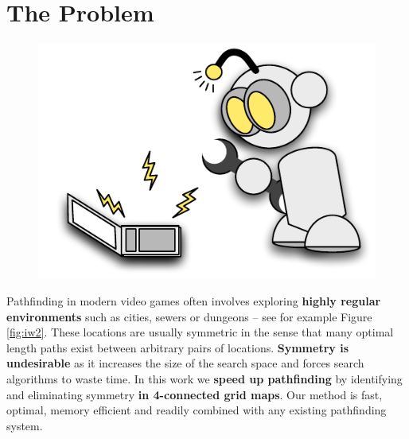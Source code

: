 \section{The Problem}
 \begin{figure}
\vspace{-3em}
		\includegraphics[width=0.30\columnwidth]{diagrams/robot_mechanic.pdf}
 \end{figure}

Pathfinding in modern video games often involves exploring \textbf{highly regular 
environments} such as cities, sewers or dungeons -- see for example
Figure \ref{fig:iw2}.
These locations are usually symmetric in the sense that many optimal 
length paths exist between arbitrary pairs of locations.
\textbf{Symmetry is undesirable} as it increases the size of the search space and forces
search algorithms to waste time.
\newline \newline
In this work we \textbf{speed up pathfinding} by identifying and eliminating
symmetry \textbf{in 4-connected grid maps}.
Our method is fast, optimal, memory efficient and readily combined with any
existing pathfinding system.
\vspace{1em}
